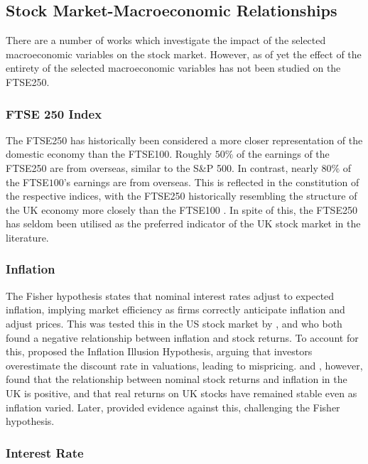 \documentclass[11pt,a4paper]{article}
\newcommand{\citeboth}[1]{\citeauthor{#1} \citep{#1}}
\begin{document}
\subsection{Stock Market-Macroeconomic Relationships}

There are a number of works which investigate the impact of 
the selected macroeconomic variables
on the stock market. However, as of yet the effect of the entirety of the selected 
macroeconomic variables has not been studied on the FTSE250. 

\subsubsection{FTSE 250 Index}

The FTSE250 has historically been considered a more closer representation of the domestic economy than the FTSE100. Roughly $50\%$ of the earnings of the FTSE250 are from overseas, similar to the S\&P 500. In contrast, nearly $80\%$ of the FTSE$100$'s earnings are from overseas. 
This is reflected in the constitution of the respective indices, with the 
FTSE250 historically resembling the structure of the UK economy more closely than the FTSE100 \citep{ftse250history}.
In spite of this, the FTSE250 has seldom been utilised as the preferred indicator of the UK stock market in the literature.

\subsubsection{Inflation}

The Fisher hypothesis states that nominal interest rates adjust to expected 
inflation, implying market efficiency as firms correctly anticipate inflation 
and adjust prices. This was tested this in the US stock market by \citeboth{jaffe1976}, and
\citeboth{bodie1976} who both found a negative relationship between inflation and stock returns.
To account for this,
\citeboth{mogdiliani1979} proposed the Inflation Illusion Hypothesis, 
arguing that investors overestimate the discount rate in valuations, leading to mispricing. 
\citeboth{gultekin1983} and \citeboth{firth1979}, however, found that the relationship between nominal stock returns and inflation in the UK is positive, and that real returns on UK stocks have remained stable even as inflation varied.
Later, \citeboth{hasan2008} provided evidence against this, challenging the Fisher hypothesis.

\subsubsection{Interest Rate}
\end{document}
